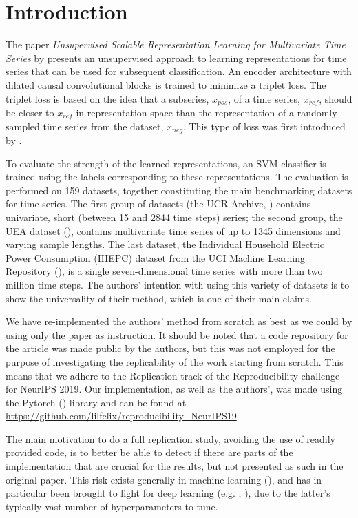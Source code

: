\section{Introduction}

The paper \textit{Unsupervised Scalable Representation Learning for Multivariate Time Series} by \cite{FranceschiUnsupervised2019} presents an unsupervised approach to learning representations for time series that can be used for subsequent classification. An encoder architecture with dilated causal convolutional blocks is trained to minimize a triplet loss. The triplet loss is based on the idea that a subseries, $x_{pos}$, of a time series, $x_{ref}$, should be closer to $x_{ref}$ in representation space than the representation of a randomly sampled time series from the dataset, $x_{neg}$. This type of loss was first introduced by \cite{ogtriplet}.

To evaluate the strength of the learned representations, an SVM classifier is trained using the labels corresponding to these representations. The evaluation is performed on 159 datasets, together constituting the main benchmarking datasets for time series. The first group of datasets (the UCR Archive, \cite{UCRArchive2018}) contains univariate, short (between 15 and 2844 time steps) series; the second group, the UEA dataset (\cite{bagnall2018uea}), contains multivariate time series of up to 1345 dimensions and varying sample lengths. The last dataset, the Individual Household Electric Power Consumption (IHEPC) dataset from the UCI Machine Learning Repository (\cite{Dua:2019}), is a single seven-dimensional time series with more than two million time steps. The authors' intention with using this variety of datasets is to show the universality of their method, which is one of their main claims.

We have re-implemented the authors' method from scratch as best as we could by using only the paper as instruction. It should be noted that a code repository for the article was made public by the authors, but this was not employed for the purpose of investigating the replicability of the work starting from scratch. This means that we adhere to the Replication track of the Reproducibility challenge for NeurIPS 2019. Our implementation, as well as the authors', was made using the Pytorch (\cite{Pytorchpaszke2017automatic}) library and can be found at \url{https://github.com/lilfelix/reproducibility_NeurIPS19}.

The main motivation to do a full replication study, avoiding the use of readily provided code, is to better be able to detect if there are parts of the implementation that are crucial for the results, but not presented as such in the original paper. This risk exists generally in machine learning (\cite{LiptonTroubling}), and has in particular been brought to light for deep learning (e.g. \cite{henderson2017reinforcement}, \cite{Hyper1Melis}), due to the latter's typically vast number of hyperparameters to tune.

